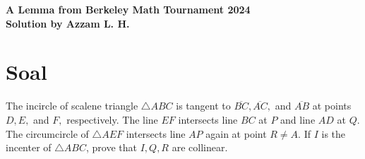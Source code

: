 \begin{center}
    \textbf{\Huge A Lemma from Berkeley Math Tournament 2024}\\
    \textbf{\large Solution by Azzam L. H.}
\end{center}

\section{Soal} 
The incircle of scalene triangle $\triangle{ABC}$ is tangent to $\overline{BC}, \overline{AC},$ and $\overline{AB}$ at points $D, E,$ and $F,$ respectively. The line $EF$ intersects line $BC$ at $P$ and line $AD$ at $Q.$ The circumcircle of $\triangle{AEF}$ intersects line $AP$ again at point $R \neq A$. If $I$ is the incenter of $\triangle{ABC}$, prove that $I,Q,R$ are collinear.

